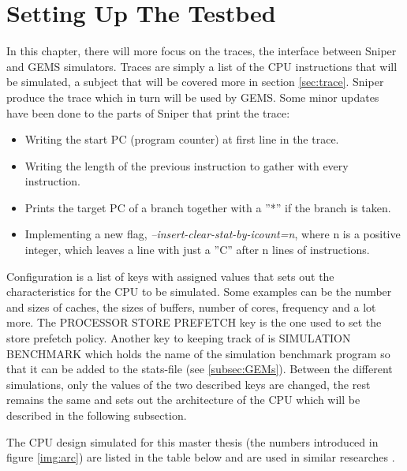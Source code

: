 \chapter{Setting Up The Testbed}
\label{chap:SettingUpTheTestbed} 
 In this chapter, there will more focus on the traces, the interface between Sniper
and GEMS simulators. Traces are simply a list of the CPU instructions that will be
simulated, a subject that will be covered more in section \ref{sec:trace}. Sniper produce the
trace which in turn will be used by GEMS. Some minor updates have been done to
the parts of Sniper that print the trace:

\begin{itemize}
\item Writing the start PC (program counter) at first line in the trace.
\item Writing the length of the previous instruction to gather with every instruction.
\item Prints the target PC of a branch together with a ”*” if the branch is taken.
\item Implementing a new flag,\emph{ –insert-clear-stat-by-icount=n}, where n is a positive
integer, which leaves a line with just a ”C” after n lines of instructions.    
\end{itemize}

Configuration is a list of keys with assigned values that sets out the characteristics
for the CPU to be simulated. Some examples can be the number and sizes of
caches, the sizes of buffers, number of cores, frequency and a lot more. The PROCESSOR
STORE PREFETCH key is the one used to set the store prefetch policy. Another
key to keeping track of is SIMULATION BENCHMARK which holds the name of
the simulation benchmark program so that it can be added to the stats-file (see
\ref{subsec:GEMs}). Between the different simulations, only the values of the two described keys
are changed, the rest remains the same and sets out the architecture of the CPU
which will be described in the following subsection.

\newpage
{}
The CPU design simulated for this master thesis (the numbers introduced in figure
\ref{img:arc}) are listed in the table below and are used in similar researches \cite{thePaper}. 

